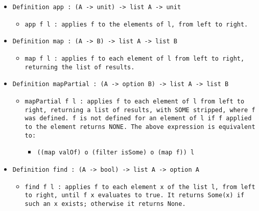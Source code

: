 \documentclass[11pt]{report}
\begin{document}
\begin{itemize}
\item  \texttt{Definition app : (A -> unit) -> list A -> unit}

\begin{itemize}
\item  \texttt{app f l : applies f to the elements of l, from left to right.}
\end{itemize}

\item  \texttt{Definition map : (A -> B) -> list A -> list B}

\begin{itemize}
\item  \begin{flushleft} \texttt{map f l : applies f to each element of l from left to right, returning the list of results.} \end{flushleft}
\end{itemize}

\item   \texttt{Definition mapPartial : (A -> option B) -> list A -> list B}

\begin{itemize}
\item   \begin{flushleft} \texttt{mapPartial f l : applies f to each element of l from left to right, returning a list of results, with SOME stripped, where f was defined. f is not defined for an element of l if f applied to the element returns NONE. The above expression is equivalent to:} \end{flushleft}

\begin{itemize}
\item  \texttt{((map valOf) o (filter isSome) o (map f)) l}
\end{itemize}

\end{itemize}

\item \texttt{Definition find : (A -> bool) -> list A -> option A}

\begin{itemize}
\item  \begin{flushleft} \texttt{find f l : applies f to each element x of the list l, from left to right, until f x evaluates to true. It returns Some(x) if such an x exists; otherwise it returns None.} \end{flushleft}
\end{itemize}


\end{itemize}
\end{document}
